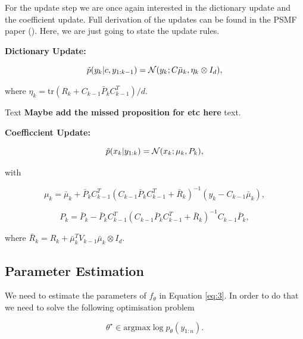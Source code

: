 \documentclass{mldsmsc}
\begin{document}
\noindent For the update step we are once again interested in the dictionary update and the coefficient update. Full derivation of the updates can be found in the PSMF paper (\cite{akyildiz2021probabilistic}). Here, we are just going to state the update rules. \newline

\noindent \textbf{Dictionary Update:}

\begin{equation}
    \Tilde{p}(y_k | c, y_{1:k-1}) = \mathcal{N}(y_k; C \bar{\mu}_k, \eta_k \otimes I_d),
\end{equation}

\noindent where $\eta_k = \text{tr}(R_k + C_{k-1} \bar{P}_{k} C_{k-1}^{T}) / d$. \newline

Text \textbf{Maybe add the missed proposition for etc here} text. \newline 

\noindent \textbf{Coefficcient Update:}

\begin{equation}
    \Tilde{p}(x_k | y_{1:k}) = \mathcal{N}(x_k; \mu_k, P_k),
\end{equation}

with 

\begin{equation}
    \mu_k = \bar{\mu}_k +  \bar{P}_k C_{k-1}^T \left(C_{k-1} \bar{P}_k C_{k-1}^T + \bar{R}_k\right)^{-1} (y_k - C_{k-1} \bar{\mu}_k),
\end{equation}

\begin{equation} \label{eq:6}
    P_k = \bar{P}_k - \bar{P}_k C_{k-1}^T \left(C_{k-1} \bar{P}_k C_{k-1}^T + \bar{R}_k\right)^{-1} C_{k-1} \bar{P}_k,
\end{equation}

\noindent where $\bar{R}_k = R_k + \bar{\mu}_k^T V_{k-1} \bar{\mu}_k \otimes I_d$.

\subsection{Parameter Estimation}

We need to estimate the parameters of $f_{\theta}$ in Equation \ref{eq:3}. In order to do that we need to solve the following optimisation problem

\begin{equation}
    \theta^{\star} \in \text{argmax} \log p_{\theta}(y_{1:n}).
\end{equation}
\end{document}
